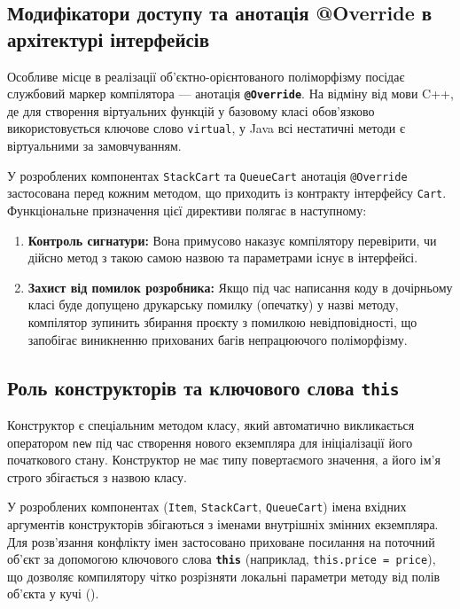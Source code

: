 \subsection{Модифікатори доступу та анотація @Override в архітектурі інтерфейсів}

Особливе місце в реалізації об'єктно-орієнтованого поліморфізму посідає службовий маркер 
компілятора — анотація \textbf{\texttt{@Override}}. На відміну від мови C++, де для 
створення віртуальних функцій у базовому класі обов'язково використовується ключове слово 
\texttt{virtual}, у Java всі нестатичні методи є віртуальними за замовчуванням. 

У розроблених компонентах \texttt{StackCart} та \texttt{QueueCart} анотація \texttt{@Override} 
застосована перед кожним методом, що приходить із контракту інтерфейсу \texttt{Cart}. Функціональне 
призначення цієї директиви полягає в наступному:
\begin{enumerate}
    \item \textbf{Контроль сигнатури:} 
    Вона примусово наказує компілятору перевірити, чи дійсно метод з такою самою назвою та 
    параметрами існує в інтерфейсі.
    \item \textbf{Захист від помилок розробника:} 
    Якщо під час написання коду в дочірньому класі буде допущено друкарську помилку 
    (опечатку) у назві методу, компілятор зупинить збирання проєкту з помилкою невідповідності, 
    що запобігає виникненню прихованих багів непрацюючого поліморфізму.

\end{enumerate}


\subsection{Роль конструкторів та ключового слова \texttt{this}}

Конструктор є спеціальним методом класу, який автоматично викликається оператором \texttt{new} 
під час створення нового екземпляра для ініціалізації його початкового стану. Конструктор не 
має типу повертаємого значення, а його ім'я строго збігається з назвою класу. 

У розроблених компонентах (\texttt{Item}, \texttt{StackCart}, \texttt{QueueCart}) імена 
вхідних аргументів конструкторів збігаються з іменами внутрішніх змінних екземпляра. Для 
розв'язання конфлікту імен застосовано приховане посилання на поточний об'єкт за допомогою 
ключового слова \textbf{\texttt{this}} (наприклад, \texttt{this.price = price}), що дозволяє 
компилятору чітко розрізняти локальні параметри методу від полів об'єкта у кучі ().

